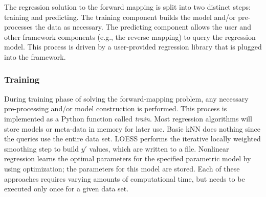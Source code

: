 The \fw regression solution to the forward mapping is split into two distinct steps: training and predicting.
The training component builds the model and/or pre-processes the data as necessary.
The predicting component allows the user and other framework components (e.g., the reverse mapping) to query the regression model.
This process is driven by a user-provided regression library that is plugged into the framework.

\subsubsection{Training}

During training phase of solving the forward-mapping problem, any necessary pre-processing and/or model construction is performed.
This process is implemented as a Python function called \textit{train}.
Most regression algorithms will store models or meta-data in memory for later use.
Basic kNN does nothing since the queries use the entire data set.
LOESS performs the iterative locally weighted smoothing step to build $y'$ values, which are
written to a file.
Nonlinear regression learns the optimal parameters for the specified parametric model by using optimization; the parameters for this model are stored.
Each of these approaches requires varying amounts of computational time, but needs to be executed only once for a given data set.


